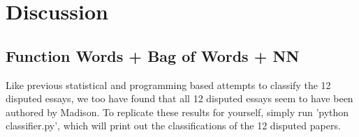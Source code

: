 \documentclass[twoside]{article}
\begin{document}
\begin{multicols}{2}
\begin{table}[H]
\begin{tabular}{llr}
\bottomrule
\end{tabular}
\end{table}








\section{Discussion}



\subsection{Function Words + Bag of Words + NN}

Like previous statistical and programming based attempts to classify the 12 disputed essays, we too have found that all 12 disputed essays seem to have been authored by Madison. To replicate these results for yourself, simply run 'python classifier.py', which will print out the classifications of the 12 disputed papers.



 


\end{multicols}
\end{document}
